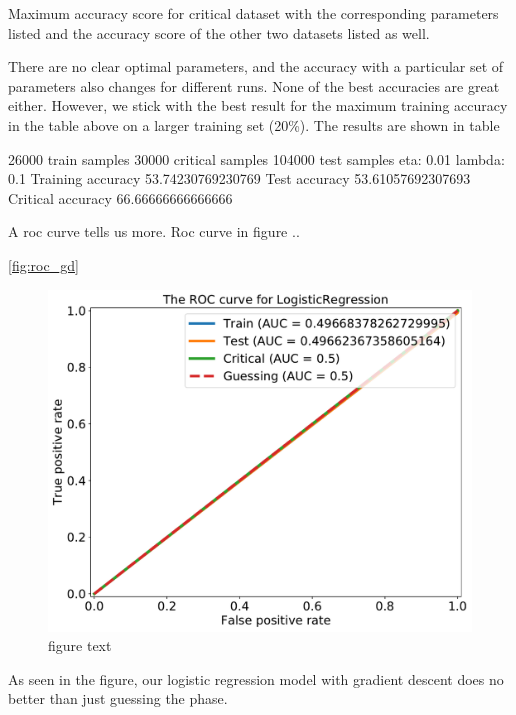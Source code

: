 \begin{table}[H]
\caption{Maximum accuracy score for critical dataset with the corresponding parameters listed and the accuracy score of the other two datasets listed as well.}
\centering
{}

\label{tab:opt params crit}
\end{table}

There are no clear optimal parameters, and the accuracy with a particular set of parameters also changes for different runs. None of the best accuracies are great either. However, we stick with the best result for the maximum training accuracy in the table above on a larger training set (20\%). The results are shown in table

26000 train samples
30000 critical samples
104000 test samples
eta: 0.01
lambda: 0.1
Training accuracy 53.74230769230769
Test accuracy 53.61057692307693
Critical accuracy 66.66666666666666

A roc curve tells us more. Roc curve in figure ..

\autoref{fig:roc_gd}

\begin{figure}[H]
\begin{center}\includegraphics[scale=0.5]{latex/figures/logistic_roc_curve_gd.pdf}
\end{center}
\caption{figure text}
\label{fig:roc_gd}
\end{figure}

As seen in the figure, our logistic regression model with gradient descent does no better than just guessing the phase.

